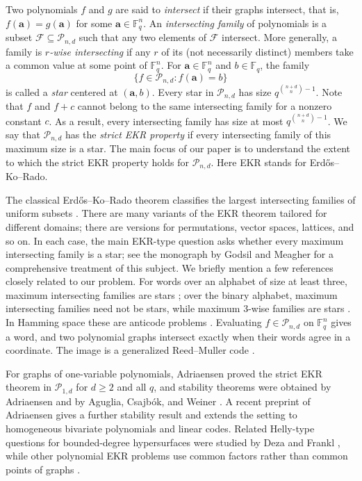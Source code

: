 \documentclass[12pt,reqno]{amsart}
\theoremstyle{definition}
\newcommand{\F}{\mathbb{F}}
\newcommand{\cP}{\mathcal P}
\begin{document}
Two polynomials $f$ and $g$ are said to \emph{intersect} if their graphs intersect, that is, $f(\mathbf{a})=g(\mathbf{a})$ for some $\mathbf{a}\in \F_{q}^{n}$. An \emph{intersecting family} of polynomials is a subset $\mathcal{F}\subseteq \cP_{n,d}$ such that any two elements of $\mathcal{F}$ intersect. More generally, a family is \emph{$r$-wise intersecting} if any $r$ of its (not necessarily distinct) members take a common value at some point of $\F_q^n$. For $\mathbf a\in \F_q^n$ and $b\in \F_q$, the family
\[
\{f\in\cP_{n,d}:f(\mathbf a)=b\}
\]
is called a \emph{star} centered at $(\mathbf{a},b)$. Every star in $\cP_{n,d}$ has size $q^{\binom{n+d}{n}-1}$. Note that $f$ and $f+c$ cannot belong to the same intersecting family for a nonzero constant $c$. As a result, every intersecting family has size at most $q^{\binom{n+d}{n}-1}$. We say that $\cP_{n,d}$ has the \emph{strict EKR property} if every intersecting family of this maximum size is a star. The main focus of our paper is to understand the extent to which the strict EKR property holds for $\cP_{n,d}$. Here EKR stands for Erd\H{o}s--Ko--Rado.

The classical Erd\H{o}s--Ko--Rado theorem classifies the largest intersecting families of uniform subsets \cite{EKR61}. There are many variants of the EKR theorem tailored for different domains; there are versions for permutations, vector spaces, lattices, and so on. In each case, the main EKR-type question asks whether every maximum intersecting family is a star; see the monograph \cite{GM16} by Godsil and Meagher for a comprehensive treatment of this subject. We briefly mention a few references closely related to our problem. For words over an alphabet of size at least three, maximum intersecting families are stars \cite{Livingston79,M82}; over the binary alphabet, maximum intersecting families need not be stars, while maximum 3-wise families are stars \cite{AY26}. In Hamming space these are anticode problems \cite{AK98}. Evaluating $f\in\cP_{n,d}$ on $\F_q^n$ gives a word, and two polynomial graphs intersect exactly when their words agree in a coordinate. The image is a generalized Reed--Muller code \cite{DGM70}. 


For graphs of one-variable polynomials, Adriaensen \cite{A22} proved the strict EKR theorem in $\cP_{1,d}$ for $d\geq 2$ and all $q$, and stability theorems were obtained by Adriaensen \cite{A22b} and by Aguglia, Csajb\'{o}k, and Weiner \cite{ACW24}. A recent preprint of Adriaensen \cite{Adriaensen25Codes} gives a further stability result and extends the setting to homogeneous bivariate polynomials and linear codes. Related Helly-type questions for bounded-degree hypersurfaces were studied by Deza and Frankl \cite{DF87}, while other polynomial EKR problems use common factors rather than common points of graphs \cite{GMM24,ST25}.
\end{document}
